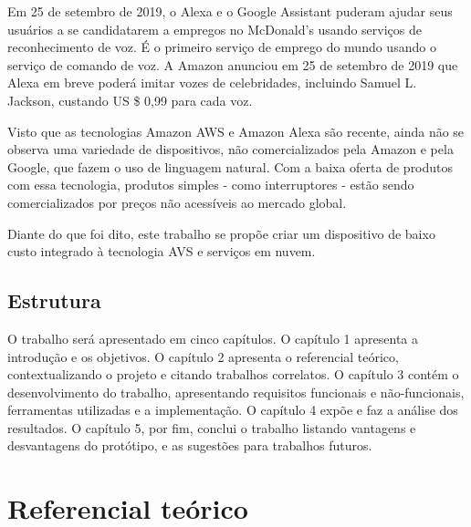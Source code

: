 \documentclass[
    12pt,
    openright,
    twoside,
    a4paper,
    english,
    spanish,
    brazil,
    ]{abntex2}
\begin{document}
Em 25 de setembro de 2019, o Alexa e o Google Assistant puderam ajudar seus usuários a se candidatarem a empregos no McDonald's usando serviços de reconhecimento de voz. É o primeiro serviço de emprego do mundo usando o serviço de comando de voz. A Amazon anunciou em 25 de setembro de 2019 que Alexa em breve poderá imitar vozes de celebridades, incluindo Samuel L. Jackson, custando US \$ 0,99 para cada voz.

Visto que as tecnologias Amazon AWS e Amazon Alexa são recente, ainda não se observa uma variedade de dispositivos, não comercializados pela Amazon e pela Google, que fazem o uso de linguagem natural. Com a baixa oferta de produtos com essa tecnologia, produtos simples - como interruptores - estão sendo comercializados por preços não acessíveis ao mercado global.

Diante do que foi dito, este trabalho se propõe criar um dispositivo de baixo custo integrado à tecnologia AVS e serviços em nuvem.

\section{Estrutura}
O trabalho será apresentado em cinco capítulos. O capítulo 1 apresenta a introdução e os objetivos. O capítulo 2 apresenta o referencial teórico, contextualizando o projeto e citando trabalhos correlatos. O capítulo 3 contém o desenvolvimento do trabalho, apresentando requisitos funcionais e não-funcionais, ferramentas utilizadas e a implementação. O capítulo 4 expõe e faz a análise dos resultados. O capítulo 5, por fim, conclui o trabalho listando vantagens e desvantagens do protótipo, e as sugestões para trabalhos futuros.

\chapter{Referencial teórico}


\end{document}
